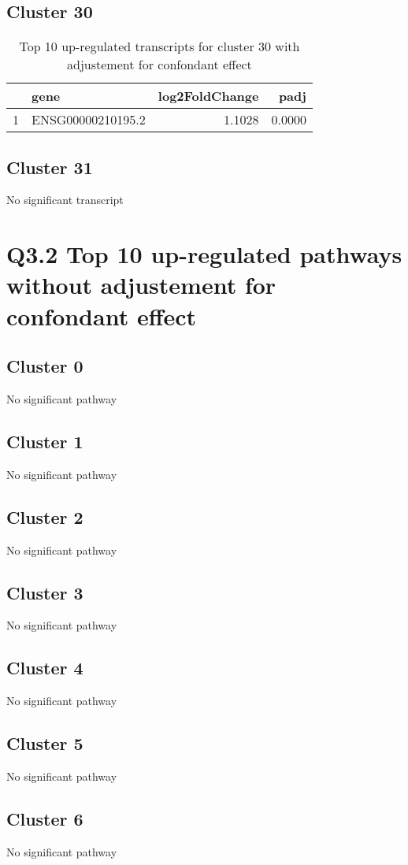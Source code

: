 \documentclass{article}
\begin{document}
\subsection{Cluster 30 }
\begin{table}[H]
\centering
\begin{tabular}{rlrr}
  \hline
 & gene & log2FoldChange & padj \\ 
  \hline
1 & ENSG00000210195.2 & 1.1028 & 0.0000 \\ 
   \hline
\end{tabular}
\caption{Top 10 up-regulated transcripts for cluster 30 with adjustement for confondant effect} 
\label{tab:q3_1_conf_30}
\end{table}
\subsection{Cluster 31 }
No significant transcript
\section{Q3.2 Top 10 up-regulated pathways without adjustement for confondant effect}
\subsection{Cluster 0 }
No significant pathway
\subsection{Cluster 1 }
No significant pathway
\subsection{Cluster 2 }
No significant pathway
\subsection{Cluster 3 }
No significant pathway
\subsection{Cluster 4 }
No significant pathway
\subsection{Cluster 5 }
No significant pathway
\subsection{Cluster 6 }
No significant pathway
\end{document}
